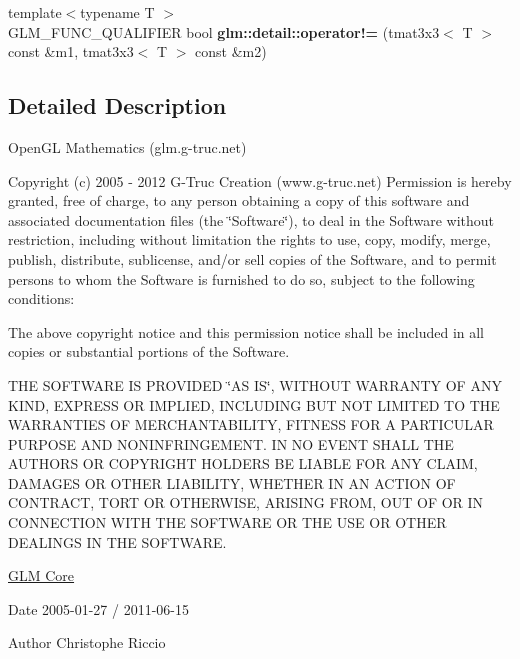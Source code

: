 \begin{DoxyCompactItemize}
\item 
\hypertarget{namespaceglm_1_1detail_aa86795cb0a4455548dc35fa6edf2e034}{{\footnotesize template$<$typename T $>$ }\\\-G\-L\-M\-\_\-\-F\-U\-N\-C\-\_\-\-Q\-U\-A\-L\-I\-F\-I\-E\-R bool {\bfseries glm\-::detail\-::operator!=} (tmat3x3$<$ \-T $>$ const \&m1, tmat3x3$<$ \-T $>$ const \&m2)}\label{namespaceglm_1_1detail_aa86795cb0a4455548dc35fa6edf2e034}

\end{DoxyCompactItemize}


\subsection{\-Detailed \-Description}
\-Open\-G\-L \-Mathematics (glm.\-g-\/truc.\-net)

\-Copyright (c) 2005 -\/ 2012 \-G-\/\-Truc \-Creation (www.\-g-\/truc.\-net) \-Permission is hereby granted, free of charge, to any person obtaining a copy of this software and associated documentation files (the \char`\"{}\-Software\char`\"{}), to deal in the \-Software without restriction, including without limitation the rights to use, copy, modify, merge, publish, distribute, sublicense, and/or sell copies of the \-Software, and to permit persons to whom the \-Software is furnished to do so, subject to the following conditions\-:

\-The above copyright notice and this permission notice shall be included in all copies or substantial portions of the \-Software.

\-T\-H\-E \-S\-O\-F\-T\-W\-A\-R\-E \-I\-S \-P\-R\-O\-V\-I\-D\-E\-D \char`\"{}\-A\-S I\-S\char`\"{}, \-W\-I\-T\-H\-O\-U\-T \-W\-A\-R\-R\-A\-N\-T\-Y \-O\-F \-A\-N\-Y \-K\-I\-N\-D, \-E\-X\-P\-R\-E\-S\-S \-O\-R \-I\-M\-P\-L\-I\-E\-D, \-I\-N\-C\-L\-U\-D\-I\-N\-G \-B\-U\-T \-N\-O\-T \-L\-I\-M\-I\-T\-E\-D \-T\-O \-T\-H\-E \-W\-A\-R\-R\-A\-N\-T\-I\-E\-S \-O\-F \-M\-E\-R\-C\-H\-A\-N\-T\-A\-B\-I\-L\-I\-T\-Y, \-F\-I\-T\-N\-E\-S\-S \-F\-O\-R \-A \-P\-A\-R\-T\-I\-C\-U\-L\-A\-R \-P\-U\-R\-P\-O\-S\-E \-A\-N\-D \-N\-O\-N\-I\-N\-F\-R\-I\-N\-G\-E\-M\-E\-N\-T. \-I\-N \-N\-O \-E\-V\-E\-N\-T \-S\-H\-A\-L\-L \-T\-H\-E \-A\-U\-T\-H\-O\-R\-S \-O\-R \-C\-O\-P\-Y\-R\-I\-G\-H\-T \-H\-O\-L\-D\-E\-R\-S \-B\-E \-L\-I\-A\-B\-L\-E \-F\-O\-R \-A\-N\-Y \-C\-L\-A\-I\-M, \-D\-A\-M\-A\-G\-E\-S \-O\-R \-O\-T\-H\-E\-R \-L\-I\-A\-B\-I\-L\-I\-T\-Y, \-W\-H\-E\-T\-H\-E\-R \-I\-N \-A\-N \-A\-C\-T\-I\-O\-N \-O\-F \-C\-O\-N\-T\-R\-A\-C\-T, \-T\-O\-R\-T \-O\-R \-O\-T\-H\-E\-R\-W\-I\-S\-E, \-A\-R\-I\-S\-I\-N\-G \-F\-R\-O\-M, \-O\-U\-T \-O\-F \-O\-R \-I\-N \-C\-O\-N\-N\-E\-C\-T\-I\-O\-N \-W\-I\-T\-H \-T\-H\-E \-S\-O\-F\-T\-W\-A\-R\-E \-O\-R \-T\-H\-E \-U\-S\-E \-O\-R \-O\-T\-H\-E\-R \-D\-E\-A\-L\-I\-N\-G\-S \-I\-N \-T\-H\-E \-S\-O\-F\-T\-W\-A\-R\-E.

\hyperlink{group__core}{\-G\-L\-M \-Core}

\begin{DoxyDate}{\-Date}
2005-\/01-\/27 / 2011-\/06-\/15 
\end{DoxyDate}
\begin{DoxyAuthor}{\-Author}
\-Christophe \-Riccio 
\end{DoxyAuthor}
